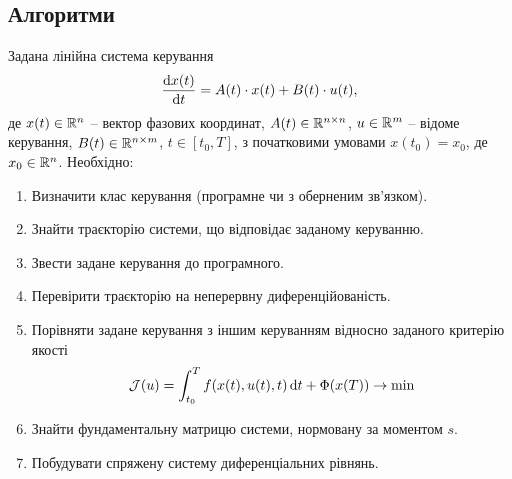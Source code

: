 \subsection{Алгоритми}

\begin{problem*}
	Задана лінійна система керування 
	\begin{equation} 
	    \label{eq:algo-1-1}
	    \frac{\mathop{}\!\mathrm{d} x(t)}{\mathop{}\!\mathrm{d} t} = A (t) \cdot x(t) + B(t) \cdot u(t),
	\end{equation} 
	де $x(t) \in \mathbb{R}^n$ -- вектор фазових координат, $A(t) \in \mathbb{R}^{n\times n}$, $u \in \mathbb{R}^m$ -- відоме керування, $B(t) \in \mathbb{R}^{n \times m}$, $t \in [t_0, T]$, з початковими умовами $x(t_0) = x_0$, де $x_0 \in \mathbb{R}^n$. Необхідно:
	\begin{enumerate}
		\item Визначити клас керування (програмне чи з оберненим зв'язком).
		\item Знайти траєкторію системи, що відповідає заданому керуванню.
		\item Звести задане керування до програмного.
		\item Перевірити траєкторію на неперервну диференційованість.
		\item Порівняти задане керування з іншим керуванням відносно заданого критерію якості 
		\begin{equation}
		    \label{eq:algo-1-2}
		    \mathcal{J}(u) = \int_{t_0}^T f(x(t), u(t), t) \mathop{}\!\mathrm{d} t + \Phi(x(T)) \to \min    
		\end{equation}
		\item Знайти фундаментальну матрицю системи, нормовану за моментом $s$. %
		\item Побудувати спряжену систему диференціальних рівнянь.
	\end{enumerate}
\end{problem*}


